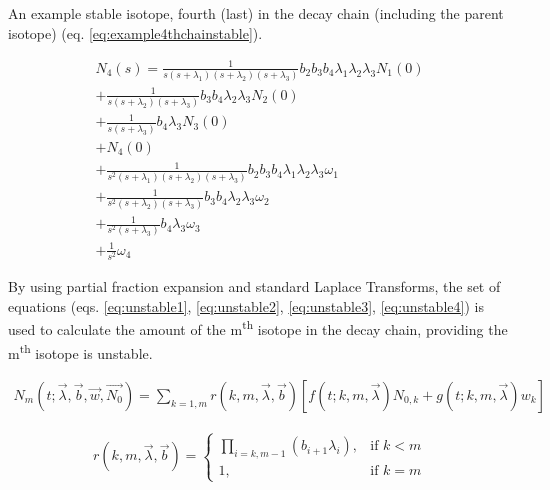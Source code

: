An example stable isotope, fourth (last) in the decay chain (including the parent isotope) (eq. \ref{eq:example4thchainstable}).

\begin{equation}
\begin{split}
N_{4}(s) =
\frac{1}{s(s+\lambda_1)(s+\lambda_2)(s+\lambda_3)} b_{2} b_{3} b_{4} \lambda_1 \lambda_2 \lambda_3 N_{1}(0) \\
+ \frac{1}{s(s+\lambda_2)(s+\lambda_3)} b_{3} b_{4} \lambda_2 \lambda_3 N_{2}(0) \\
+ \frac{1}{s(s+\lambda_3)} b_{4} \lambda_3 N_{3}(0) \\
+ N_{4}(0) \\
+ \frac{1}{s^2(s+\lambda_1)(s+\lambda_2)(s+\lambda_3)} b_{2} b_{3} b_{4} \lambda_1 \lambda_2 \lambda_3 \omega_{1} \\
+ \frac{1}{s^2(s+\lambda_2)(s+\lambda_3)} b_{3} b_{4} \lambda_2 \lambda_3 \omega_{2} \\
+ \frac{1}{s^2(s+\lambda_3)} b_{4} \lambda_3 \omega_{3} \\
+ \frac{1}{s^2} \omega_{4}
\end{split}
\label{eq:example4thchainstable}
\end{equation}

By using partial fraction expansion and standard Laplace Transforms, the set of equations (eqs. \ref{eq:unstable1}, \ref{eq:unstable2}, \ref{eq:unstable3}, \ref{eq:unstable4}) is used to calculate the amount of the m\textsuperscript{th} isotope in the decay chain, providing the m\textsuperscript{th} isotope is unstable.

\begin{equation}
\begin{split}
N_{m}(t; \vec{\lambda}, \vec{b}, \vec{w}, \vec{N_{0}})
= \sum_{k=1,m} r(k, m, \vec{\lambda}, \vec{b}) \left[ f(t; k,m,\vec{\lambda}) N_{0, k} + g(t;k,m,\vec{\lambda}) w_{k} \right ]
\end{split}
\label{eq:unstable1}
\end{equation}

\begin{equation}
\begin{split}
r(k,m,\vec{\lambda}, \vec{b}) =
\begin{cases}
\prod_{i=k,m-1} \left( b_{i+1} \lambda_{i} \right) , & \text{if } k < m\\
1, & \text{if }k = m
\end{cases}
\end{split}
\label{eq:unstable2}
\end{equation}


